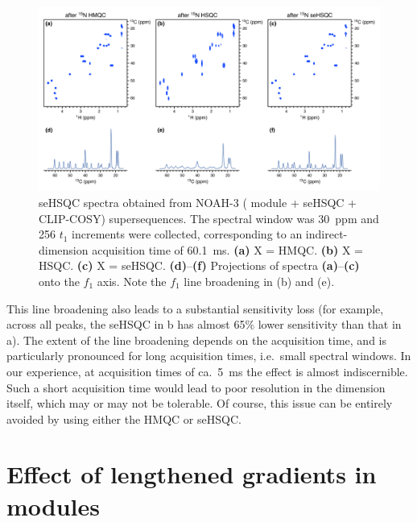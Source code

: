 \begin{figure}
    \centering
    \includegraphics[width=\textwidth]{./figures/n15_linebroadening.png}
    \caption{
        \carbon{} seHSQC spectra obtained from NOAH-3  (\nitrogen{} module + \carbon{} seHSQC + CLIP-COSY) supersequences.
        The \nitrogen{} spectral window was \SI{30}{ppm} and 256 $t_1$ increments were collected, corresponding to an indirect-dimension \nitrogen{} acquisition time of \SI{60.1}{\ms}.
        \textbf{(a)} X = HMQC.
        \textbf{(b)} X = HSQC.
        \textbf{(c)} X = seHSQC.
        \textbf{(d)}--\textbf{(f)} Projections of spectra \textbf{(a)}--\textbf{(c)} onto the $f_1$ axis.
        Note the $f_1$ line broadening in (b) and (e).
        \grami{}
    }
    \label{fig:n15_linebroadening}
\end{figure}

This line broadening also leads to a substantial sensitivity loss (for example, across all peaks, the \carbon{} seHSQC in b has almost 65\% lower sensitivity than that in a).
The extent of the line broadening depends on the acquisition time, and is particularly pronounced for long acquisition times, i.e.\ small \nitrogen{} spectral windows.
In our experience, at \nitrogen{} acquisition times of ca.\ \SI{5}{\ms} the effect is almost indiscernible.
Such a short acquisition time would lead to poor resolution in the \nitrogen{} dimension itself, which may or may not be tolerable.
Of course, this issue can be entirely avoided by using either the HMQC or seHSQC.

\section{Effect of lengthened gradients in \texorpdfstring{\nitrogen{}}{15N} modules}

